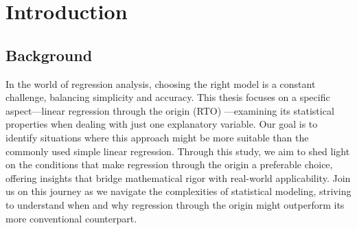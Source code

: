 \documentclass[12pt,a4paper,oneside]{book} %
\newcommand{\hsp}{\hspace{20pt}}
\begin{document}

	\frontmatter
	
	\setcounter{tocdepth}{1}
	\tableofcontents
	\listoftables
	\listoffigures
		
	\mainmatter
	
	\pagestyle{plain}
	
	\titleformat{\chapter}[display]{\normalfont\huge\bfseries}{\chaptertitlename\ \thechapter}{20pt}{\Huge}
	\titlespacing*{\chapter}{10pt}{20pt}{40pt}
	 
	\titleformat{\chapter}[hang]{\Huge\bfseries}{\thechapter.\hsp}{0pt}{\Huge\bfseries} 
	  
	\chapter{Introduction}
	
	
	\section{Background}
	In the world of regression analysis, choosing the right model is a constant challenge, balancing simplicity and accuracy. This thesis focuses on a specific aspect—linear regression through the origin (RTO) —examining its statistical properties when dealing with just one explanatory variable. Our goal is to identify situations where this approach might be more suitable than the commonly used simple linear regression. Through this study, we aim to shed light on the conditions that make regression through the origin a preferable choice, offering insights that bridge mathematical rigor with real-world applicability. Join us on this journey as we navigate the complexities of statistical modeling, striving to understand when and why regression through the origin might outperform its more conventional counterpart.
\end{document}
